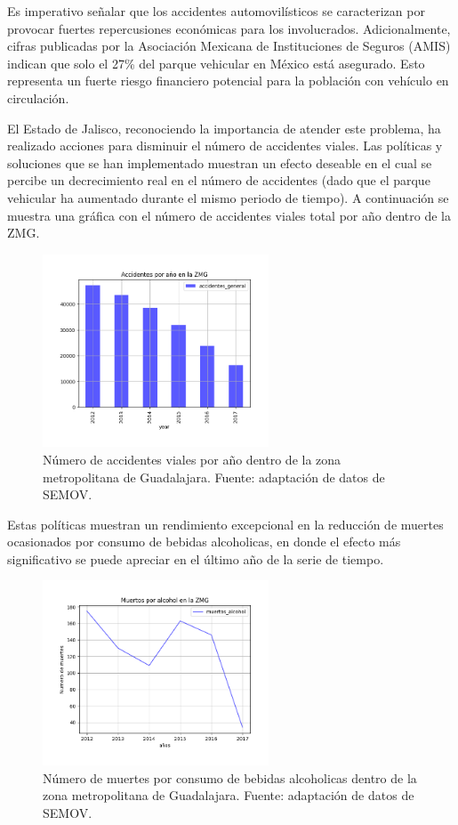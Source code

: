 \documentclass{article}
\begin{document}
Es imperativo señalar que los accidentes automovilísticos se caracterizan por provocar fuertes
repercusiones económicas para los involucrados. Adicionalmente, cifras publicadas por la
Asociación Mexicana de Instituciones de Seguros (AMIS) indican que solo el 27\% del parque vehicular en
México está asegurado. Esto representa un fuerte riesgo financiero potencial para la población con
vehículo en circulación.

El Estado de Jalisco, reconociendo la importancia de atender este problema,
ha realizado acciones para disminuir el número de accidentes viales.
Las políticas y soluciones que se han implementado muestran un efecto deseable en el cual
se percibe un decrecimiento real en el número de accidentes (dado que el parque vehicular ha aumentado
durante el mismo periodo de tiempo). A continuación se muestra una gráfica con el número
de accidentes viales total por año dentro de la ZMG.

	\begin{figure}[H]\centering
	\includegraphics[width=0.60\textwidth]{resources/img/accidentes_general_img.png}
	\caption{\label{fig:accidentes_general_img} Número de accidentes viales por año dentro de la zona metropolitana de Guadalajara. Fuente: adaptación de datos de SEMOV.}
    \end{figure}

Estas políticas muestran un rendimiento excepcional en la reducción de muertes ocasionados por consumo de bebidas alcoholicas,
en donde el efecto más significativo se puede apreciar en el último año de la serie de tiempo.


	\begin{figure}[H]\centering
	\includegraphics[width=0.60\textwidth]{resources/img/muertos_alcohol_img.png}
	\caption{\label{fig:muertes_img} Número de muertes por consumo de bebidas alcoholicas dentro de la zona metropolitana de Guadalajara. Fuente: adaptación de datos de SEMOV.}
    \end{figure}
\end{document}
